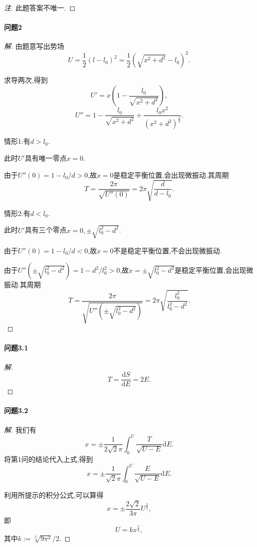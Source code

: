 \documentclass{article}
\newenvironment{solution}{\renewcommand\qedsymbol{$\blacksquare$}\begin{proof}[解]}{\end{proof}}
\newenvironment{annotation}{\renewcommand\qedsymbol{}\begin{proof}[注]}{\end{proof}}
\newcommand{\nstars}[1]{\multido{}{#1}{$\star$}}
\begin{document}
\begin{annotation}
此题答案不唯一.
\end{annotation}

\paragraph{问题2}\nstars{4}

\begin{solution}

由题意写出势场
$$U=\frac12\left(l-l_0\right)^2=\frac12\left(\sqrt{x^2+d^2}-l_0\right)^2.$$

求导两次,得到
$$U'=x\left(1-\frac{l_0}{\sqrt{x^2+d^2}}\right),$$
$$U''=1-\frac{l_0}{\sqrt{x^2+d^2}}+\frac{l_0x^2}{\left(x^2+d^2\right)^\frac32}.$$

情形1:有$d>l_0$.

此时$U'$具有唯一零点$x=0$.

由于$U''\left(0\right)=1-l_0/d>0$,故$x=0$是稳定平衡位置,会出现微振动.其周期
$$T=\frac{2\pi}{\sqrt{U''\left(0\right)}}=2\pi\sqrt{\frac d{d-l_0}}.$$

情形2:有$d<l_0$.

此时$U'$具有三个零点$x=0,\pm\sqrt{l_0^2-d^2}$.

由于$U''\left(0\right)=1-l_0/d<0$,故$x=0$不是稳定平衡位置,不会出现微振动.

由于$U''\left(\pm\sqrt{l_0^2-d^2}\right)=1-d^2/l_0^2>0$,故$x=\pm\sqrt{l_0^2-d^2}$是稳定平衡位置,会出现微振动.其周期
$$T=\frac{2\pi}{\sqrt{U''\left(\pm\sqrt{l_0^2-d^2}\right)}}=
2\pi\sqrt{\frac{l_0^2}{l_0^2-d^2}}.$$

\end{solution}

\paragraph{问题3.1}\nstars{1}

\begin{solution}

$$T=\frac{\mathrm dS}{\mathrm dE}=2E.$$

\end{solution}

\paragraph{问题3.2}\nstars{3}

\begin{solution}

我们有
$$x=\pm\frac1{2\sqrt2\pi}\int_0^U\frac T{\sqrt{U-E}}\mathrm dE.$$
将第1问的结论代入上式,得到
$$x=\pm\frac1{\sqrt2\pi}\int_0^U\frac E{\sqrt{U-E}}\mathrm dE.$$

利用所提示的积分公式,可以算得
$$x=\pm\frac{2\sqrt2}{3\pi}U^\frac32,$$
即
$$U=kx^\frac23,$$
其中$k:=\sqrt[3]{9\pi^2}/2$.

\end{solution}
\end{document}
